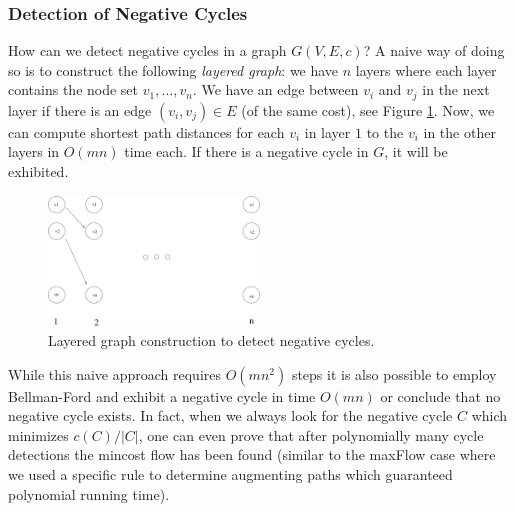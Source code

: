 \documentclass{article}
\begin{document}
\subsubsection*{Detection of Negative Cycles}
How can we detect negative cycles in a graph $G(V,E,c)$? A naive way of doing so is to construct the following \emph{layered graph}:
we have $n$ layers where each layer contains the node set $v_1, \dots, v_n$. We have an edge between $v_i$ and $v_j$ in the next
layer if there is an edge $(v_i, v_j)\in E$ (of the same cost), see Figure \ref{fig:negCycle}. Now, we can compute shortest path distances for each $v_i$ in layer $1$ to the $v_i$ in the other layers in $O(mn)$ time each. If there is a negative cycle in $G$, it will be exhibited.
\begin{figure}
\begin{center}
\includegraphics[width=0.5\textwidth]{Figs/negCycle.pdf}
\caption{Layered graph construction to detect negative cycles.}\label{fig:negCycle}
\end{center}
\end{figure}

While this naive approach requires $O(mn^2)$ steps it is also possible to employ Bellman-Ford and exhibit a negative cycle in time $O(mn)$ or conclude that no negative cycle exists.
In fact, when we always look for the negative cycle $C$ which minimizes $c(C)/|C|$, one can even prove that after polynomially many cycle detections the mincost flow has been found (similar to the maxFlow case where we used a specific rule to determine augmenting paths which guaranteed polynomial running time).
\end{document}
